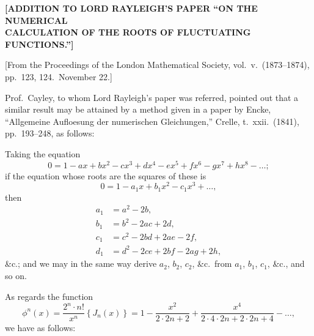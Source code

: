 \documentclass[12pt,a4paper]{article}
\theoremstyle{plain}
\theoremstyle{definition}
\begin{document}
\begin{center}
{\large \textbf{[ADDITION TO LORD RAYLEIGH'S PAPER ``ON THE NUMERICAL}}\\[4pt]
{\large \textbf{CALCULATION OF THE ROOTS OF FLUCTUATING FUNCTIONS.'']}}
\end{center}

\begin{flushright}
{\small [From the Proceedings of the London Mathematical Society, vol.\ v.\ (1873--1874), pp.\ 123, 124.\ November 22.]}
\end{flushright}

Prof.\ Cayley, to whom Lord Rayleigh's paper was referred, pointed out that a similar result may be attained by a method given in a paper by Encke, ``Allgemeine Aufloesung der numerischen Gleichungen,'' Crelle, t.\ xxii.\ (1841), pp.\ 193--248, as follows:

Taking the equation
\[
0 = 1 - ax + bx^2 - cx^3 + dx^4 - ex^5 + fx^6 - gx^7 + hx^8 - \ldots;
\]
if the equation whose roots are the squares of these is
\[
0 = 1 - a_1 x + b_1 x^2 - c_1 x^3 + \ldots,
\]
then
\begin{align*}
a_1 &= a^2 - 2b,\\
b_1 &= b^2 - 2ac + 2d,\\
c_1 &= c^2 - 2bd + 2ae - 2f,\\
d_1 &= d^2 - 2ce + 2bf - 2ag + 2h,
\end{align*}
\&c.; and we may in the same way derive $a_2$, $b_2$, $c_2$, \&c.\ from $a_1$, $b_1$, $c_1$, \&c., and so on.

As regards the function
\[
\phi^n(x) = \frac{2^n \cdot n!}{x^n}\left\{J_n(x)\right\} = 1 - \frac{x^2}{2 \cdot 2n + 2} + \frac{x^4}{2 \cdot 4 \cdot 2n + 2 \cdot 2n + 4} - \ldots,
\]
we have as follows:

\newpage
\setcounter{page}{20}
\end{document}
